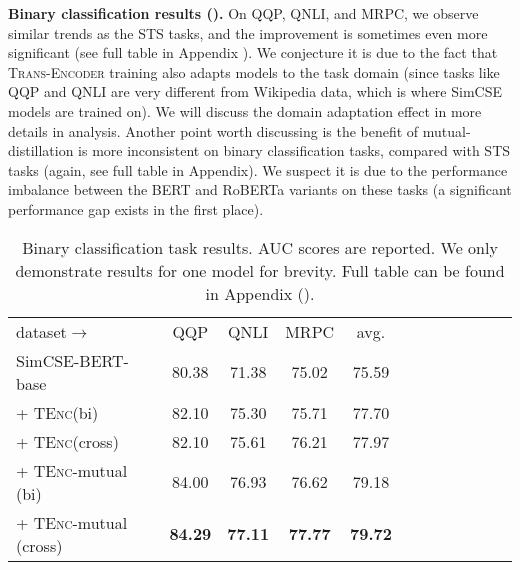 \documentclass{article} \usepackage{iclr2021_conference,times}
\newcommand{\modelname}{\textsc{Trans-Encoder}\xspace}
\newcommand{\tenc}{\textsc{TEnc}\xspace}
\begin{document}
\textbf{Binary classification results ().} On QQP, QNLI, and MRPC, we observe similar trends as the STS tasks, and the improvement is sometimes even more significant (see full table in Appendix ). We conjecture it is due to the fact that \modelname training also adapts models to the task domain (since tasks like QQP and QNLI are very different from Wikipedia data, which is where SimCSE models are trained on). We will discuss the domain adaptation effect in more details in analysis. Another point worth discussing is the benefit of mutual-distillation is more inconsistent on binary classification tasks, compared with STS tasks (again, see full table  in Appendix). We suspect it is due to the performance imbalance between the BERT and RoBERTa variants on these tasks (a significant performance gap exists in the first place). 



\begin{table}[!t] \centering
\begin{tabular}{lccccccccccc}
\cmidrule[1.5pt]{1-10}
dataset$\rightarrow$  & QQP & QNLI & MRPC & avg.\\
\cmidrule[1.5pt]{1-10}
  SimCSE-BERT-base & 80.38 & 71.38 & 75.02 & 75.59 \\
  + \tenc (bi) & 82.10 & 75.30 & 75.71 & 77.70 \\
  + \tenc (cross) & 82.10 & 75.61  & 76.21 & 77.97 \\
 \rowcolor{blue!5}
  + \tenc-mutual (bi) &  84.00 & 76.93 & 76.62 & 79.18  \\
   \rowcolor{blue!5}
  + \tenc-mutual (cross) & \textbf{84.29} & \textbf{77.11} & \textbf{77.77} & \textbf{79.72} \\
\cmidrule[1.5pt]{1-10}
\end{tabular}
\vspace{-1mm}
\caption{Binary classification task results. AUC scores are reported. We only demonstrate results for one model for brevity. Full table can be found in Appendix ().}
\label{tab:binary}
\end{table}
\end{document}

